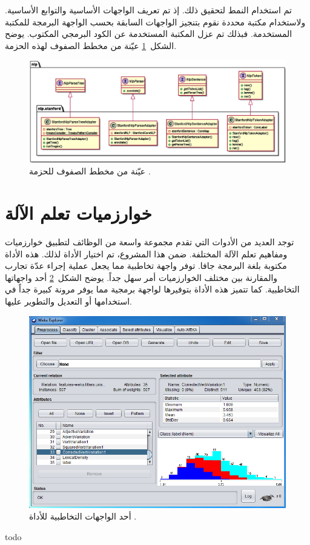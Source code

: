 تم استخدام النمط  لتحقيق ذلك.
إذ تم تعريف الواجهات الأساسية والتوابع الأساسية.
ولاستخدام مكتبة محددة نقوم بتنجيز الواجهات السابقة بحسب الواجهة البرمجة  للمكتبة المستخدمة.
فبذلك تم عزل المكتبة المستخدمة عن الكود البرمجي المكتوب.
يوضح الشكل~\ref{fig:cd:nlp} عيّنة من مخطط الصفوف لهذه الحزمة.

\begin{figure}[htb]
	\centering
	\includegraphics[width=1\linewidth]{images/cd-nlp.eps}
	\caption{%
		عيّنة من مخطط الصفوف للحزمة .
	}
	\label{fig:cd:nlp}
\end{figure}

\afterpage{\clearpage}



\section{خوارزميات تعلم الآلة}
توجد العديد من الأدوات  التي تقدم مجموعة واسعة من الوظائف لتطبيق خوارزميات ومفاهيم تعلم الآلة المختلفة.
ضمن هذا المشروع، تم اختيار الأداة
لذلك.
هذه الأداة مكتوبة بلغة البرمجة جافا.
توفر واجهة تخاطبية  مما يجعل عملية إجراء عدّة تجارب والمقارنة بين مختلف الخوارزميات أمر سهل جداً.
يوضح الشكل~\ref{fig:weka:gui} أحد واجهاتها التخاطبية.
كما تتميز هذه الأداة بتوفيرها لواجهة برمجية  مما يوفر مرونة كبيرة جداً في استخدامها أو التعديل والتطوير عليها.

\begin{figure}[htb]
	\centering
	\includegraphics[width=0.8\linewidth]{images/weka.png}
	\caption{%
		أحد الواجهات التخاطبية للأداة .
	}
	\label{fig:weka:gui}
\end{figure}

todo


